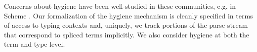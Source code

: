 \documentclass{sig-alternate}
\begin{document}
Concerns about hygiene have been well-studied in these communities, e.g. in Scheme \cite{Dybvig:1992:SAS:173617.173620}. 
Our formalization of the hygiene mechanism is cleanly specified in terms of access to typing contexts and, uniquely, we track portions of the parse stream that correspond to spliced terms implicitly. We also consider hygiene at both the term and type level.






\end{document}
